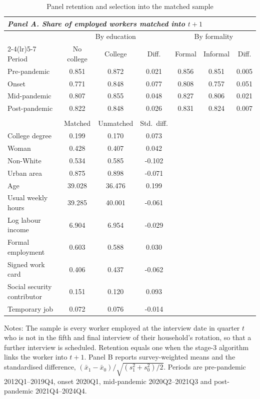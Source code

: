 \begin{table}[H]
\centering
\caption{Panel retention and selection into the matched sample}
\label{tab:attrition}
\begin{threeparttable}
\begin{tabular}{lcccccc}
\multicolumn{7}{l}{\textit{Panel A. Share of employed workers matched into $t+1$}} \\
\toprule
& \multicolumn{3}{c}{By education} & \multicolumn{3}{c}{By formality} \\
\cmidrule(lr){2-4}\cmidrule(lr){5-7}
Period & No college & College & Diff. & Formal & Informal & Diff. \\
\midrule
Pre-pandemic & 0.851 & 0.872 & 0.021 & 0.856 & 0.851 & 0.005 \\
Onset & 0.771 & 0.848 & 0.077 & 0.808 & 0.757 & 0.051 \\
Mid-pandemic & 0.807 & 0.855 & 0.048 & 0.827 & 0.806 & 0.021 \\
Post-pandemic & 0.822 & 0.848 & 0.026 & 0.831 & 0.824 & 0.007 \\
\bottomrule
\addlinespace
\multicolumn{7}{l}{\textit{Panel B. Matched vs.\ unmatched origins, all quarters}} \\
\toprule
& Matched & Unmatched & Std.\ diff. & & & \\
\midrule
College degree & 0.199 & 0.170 & 0.073 & & & \\
Woman & 0.428 & 0.407 & 0.042 & & & \\
Non-White & 0.534 & 0.585 & -0.102 & & & \\
Urban area & 0.875 & 0.898 & -0.071 & & & \\
Age & 39.028 & 36.476 & 0.199 & & & \\
Usual weekly hours & 39.285 & 40.001 & -0.061 & & & \\
Log labour income & 6.904 & 6.954 & -0.029 & & & \\
Formal employment & 0.603 & 0.588 & 0.030 & & & \\
Signed work card & 0.406 & 0.437 & -0.062 & & & \\
Social security contributor & 0.151 & 0.120 & 0.093 & & & \\
Temporary job & 0.072 & 0.076 & -0.014 & & & \\
\bottomrule
\end{tabular}
\begin{tablenotes}[flushleft]\footnotesize
\item Notes: The sample is every worker employed at the interview date in quarter $t$ who is not in the fifth and final interview of their household's rotation, so that a further interview is scheduled. Retention equals one when the stage-3 algorithm links the worker into $t+1$. Panel B reports survey-weighted means and the standardised difference, $(\bar{x}_1-\bar{x}_0)/\sqrt{(s_1^2+s_0^2)/2}$. Periods are pre-pandemic 2012Q1--2019Q4, onset 2020Q1, mid-pandemic 2020Q2--2021Q3 and post-pandemic 2021Q4--2024Q4.
\end{tablenotes}
\end{threeparttable}
\end{table}
